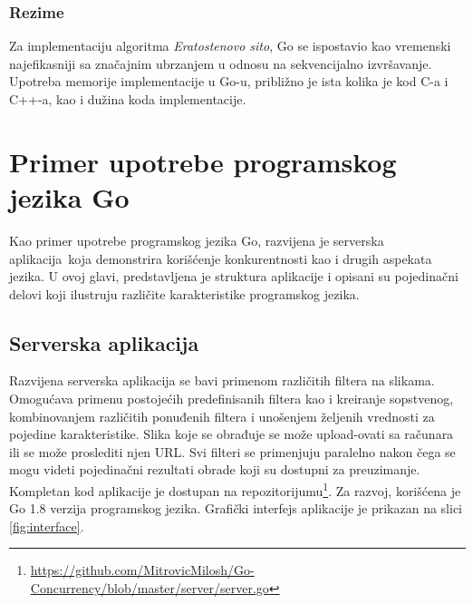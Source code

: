 \documentclass[12pt,oneside]{memoir}
\begin{document}
\subsection{Rezime}

Za implementaciju algoritma \textit{Eratostenovo sito},  Go se ispostavio kao vremenski najefikasniji sa značajnim ubrzanjem u odnosu na sekvencijalno izvršavanje. Upotreba memorije implementacije u Go-u, približno je ista kolika je kod C-a i C++-a, kao i dužina koda implementacije.


\chapter{Primer upotrebe programskog jezika Go}\label{app}

Kao primer upotrebe programskog jezika Go, razvijena je serverska aplikacija\ koja demonstrira korišćenje konkurentnosti kao i drugih aspekata jezika. U ovoj glavi, predstavljena je struktura aplikacije i opisani su pojedinačni delovi koji ilustruju različite karakteristike programskog jezika. 

\section{Serverska aplikacija}

Razvijena serverska aplikacija se bavi primenom različitih filtera na slikama. Omogućava primenu postojećih predefinisanih filtera kao i kreiranje sopstvenog, kombinovanjem različitih ponuđenih filtera i unošenjem željenih vrednosti za pojedine karakteristike. Slika koje se obrađuje se može upload-ovati sa računara ili se može proslediti njen URL. Svi filteri se primenjuju paralelno nakon čega se mogu videti pojedinačni rezultati obrade koji su dostupni za preuzimanje. Kompletan kod aplikacije je dostupan na repozitorijumu\footnote{\url{https://github.com/MitrovicMilosh/Go-Concurrency/blob/master/server/server.go}}. Za razvoj, korišćena je Go 1.8 verzija programskog jezika. Grafički interfejs aplikacije je prikazan na slici \ref{fig:interface}.
\end{document}
